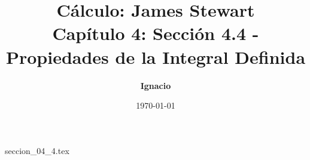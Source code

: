 \documentclass[11pt,spanish,oneside]{report}
\title{\textbf{Cálculo: James Stewart} \\ \Large Capítulo 4: Sección 4.4 - Propiedades de la Integral Definida}
\author{\textbf{Ignacio}}
\date{\today}
\begin{document}
\maketitle

{seccion_04_4.tex}
\end{document}
